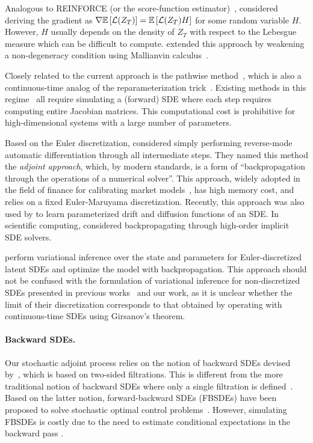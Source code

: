 \documentclass[twoside]{article}
\begin{document}
Analogous to REINFORCE (or the score-function estimator)~\citep{williams1992simple,kleijnen1996optimization,glynn1990likelihood}, \citet{yang1991monte} considered deriving the gradient as $\nabla \mathbb{E} \left[ \mathcal{L} (Z_T)  \right] = \mathbb{E} \left[  \mathcal{L}(Z_T) H  \right]$ for some random variable $H$. However, $H$ usually depends on the density of $Z_T$ with respect to the Lebesgue measure which can be difficult to compute.
\citet{gobet2005sensitivity} extended this approach by weakening a non-degeneracy condition using Mallianvin calculus~\cite{nourdin2012normal}.

Closely related to the current approach is the pathwise method~\cite{yang1991monte}, which is also a continuous-time analog of the reparameterization trick~\citep{kingma2013auto,rezende2014stochastic}. Existing methods in this regime~\citep{tzen2019neural,gobet2005sensitivity,liu2019neural} all require simulating a (forward) SDE where each step requires computing entire Jacobian matrices. This computational cost is prohibitive for high-dimensional systems with a large number of parameters.

Based on the Euler discretization, \citet{giles2006smoking} considered simply performing reverse-mode automatic differentiation through all intermediate steps.
They named this method the \textit{adjoint approach}, which, by modern standards, is a form of ``backpropagation through the operations of a numerical solver''. This approach, widely adopted in the field of finance for calibrating market models~\cite{giles2006smoking}, has high memory cost, and relies on a fixed Euler-Maruyama discretization. 
Recently, this approach was also used by \citet{hegde2019deep} to learn parameterized drift and diffusion functions of an SDE.
In scientific computing, \citet{innes2019zygote} considered backpropagating through high-order implicit SDE solvers.

\citet{ryder2018black} perform variational inference over the state and parameters for Euler-discretized latent SDEs and optimize the model with backpropagation. 
This approach should not be confused with the formulation of variational inference for non-discretized SDEs presented in previous works~\cite{opper2019variational,ha2018adaptive,tzen2019neural} and our work, as it is unclear whether the limit of their discretization corresponds to that obtained by operating with continuous-time SDEs using Girsanov's theorem.

\paragraph{Backward SDEs.} Our stochastic adjoint process relies on the notion of backward SDEs devised by~\citet{kunita2019stochastic}, which is based on two-sided filtrations. 
This is different from the more traditional notion of backward SDEs where only a single filtration is defined~\cite{peng1990general,pardoux1992backward}. 
Based on the latter notion, forward-backward SDEs (FBSDEs) have been proposed to solve stochastic optimal control problems~\cite{peng1999fully}.
However, simulating FBSDEs is costly due to the need to estimate conditional expectations in the backward pass \cite{pardoux1992backward}. 
\end{document}
